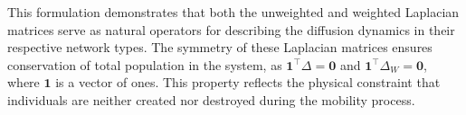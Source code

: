 This formulation demonstrates that both the unweighted and weighted Laplacian matrices serve as natural operators for describing the diffusion dynamics in their respective network types. The symmetry of these Laplacian matrices ensures conservation of total population in the system, as $\mathbf{1}^{\top}\Delta = \mathbf{0}$ and $\mathbf{1}^{\top}\Delta_W = \mathbf{0}$, where $\mathbf{1}$ is a vector of ones. This property reflects the physical constraint that individuals are neither created nor destroyed during the mobility process.
\\



